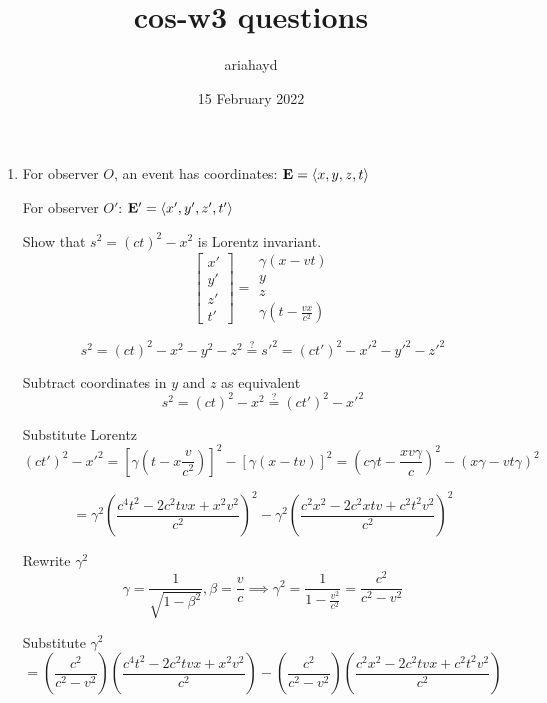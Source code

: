 \documentclass{paper}
\title{cos-w3 questions}
\author{ariahayd}
\date{15 February 2022}
\begin{document}
 

\maketitle

\begin{enumerate}
    \item %
      For observer \(O\), an event has coordinates: \(\vb{E} = \ev{x,y,z,t}\)

      For observer \(O'\): \(\vb{E'} = \ev{x',y',z',t'}\)

      Show that \(s^2 = (c t)^2 - x^2\) is Lorentz invariant.
      \begin{equation}
        \begin{bmatrix}
          x' \\ y' \\ z' \\ t'
        \end{bmatrix}
        = 
        \begin{matrix}
          \gamma (x - v t) \\ y \\ z \\ \gamma (t - \frac{vx}{c^2})
        \end{matrix}
      \end{equation}

      \[
        s^2 = (ct)^2 - x^2 - y^2 - z^2 
        \stackrel{?}{=}
        s'^2 = (ct')^2 - x'^2 - y'^2 - z'^2 
      \]

      Subtract coordinates in \(y\) and \(z\) as equivalent
      \[ s^2 = (ct)^2 - x^2 \stackrel{?}{=} (ct')^2 - x'^2 \]

      Substitute Lorentz
      \[ (ct')^2 - x'^2 = \left[\gamma\left(t - x \frac{v}{c^2}\right)\right]^2 
      - \left[\gamma\left(x - tv\right)\right]^2 
      = \left(c \gamma t - \frac{xv\gamma}{c}\right)^2 
      - \left(x\gamma - vt\gamma\right)^2 \]

      \[ = 
      \gamma^2\left(\frac{c^4t^2 - 2c^2tvx + x^2v^2}{c^2}\right)^2 
      - \gamma^2\left(\frac{c^2x^2 - 2c^2xtv + c^2t^2v^2}{c^2}\right)^2 \]

      Rewrite \(\gamma^2\)
      \[ \gamma = \frac{1}{\sqrt{1 - \beta^2}}, \beta = \frac{v}{c} \implies
      \gamma^2 = \frac{1}{1-\frac{v^2}{c^2}} = \frac{c^2}{c^2 - v^2}\]

      Substitute \(\gamma^2\)
      \[ = \left(\frac{c^2}{c^2-v^2}\right)
      \left(\frac{c^4t^2 - 2c^2tvx + x^2v^2}{c^2}\right)
      - \left(\frac{c^2}{c^2-v^2}\right)
      \left(\frac{c^2x^2 - 2c^2tvx + c^2t^2v^2}{c^2}\right)
      \]


\end{enumerate}
\end{document}
